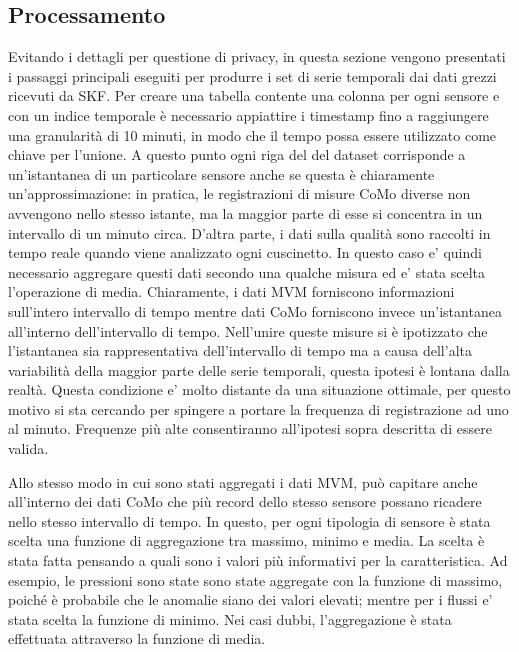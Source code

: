 \subsection{Processamento}
Evitando i dettagli per questione di privacy, in questa sezione vengono presentati i passaggi principali eseguiti per produrre i set di serie temporali dai dati grezzi ricevuti da SKF. 
Per creare una tabella contente una colonna per ogni sensore e con un indice temporale è necessario appiattire i timestamp fino a raggiungere una granularità di 10 minuti, in modo che il tempo possa essere utilizzato come chiave per l'unione. A questo punto ogni riga del del dataset corrisponde a un'istantanea di un particolare sensore anche se questa è chiaramente un'approssimazione: in pratica, le registrazioni di misure CoMo diverse non avvengono nello stesso istante, ma la maggior parte di esse si concentra in un intervallo di un minuto circa. 
D'altra parte, i dati sulla qualità sono raccolti in tempo reale quando viene analizzato ogni cuscinetto. In questo caso e' quindi necessario aggregare questi dati secondo una qualche misura ed e' stata scelta l'operazione di media.
Chiaramente, i dati MVM forniscono informazioni sull'intero intervallo di tempo mentre dati CoMo forniscono invece un'istantanea all'interno dell'intervallo di tempo.
Nell'unire queste misure si è ipotizzato che l'istantanea sia rappresentativa dell'intervallo di tempo ma a causa dell'alta variabilità della maggior parte delle serie temporali, questa ipotesi è lontana dalla realtà.
Questa condizione e' molto distante da una situazione ottimale, per questo motivo si sta cercando per spingere a portare la frequenza di registrazione ad uno al minuto. Frequenze più alte consentiranno all'ipotesi sopra descritta di essere valida.

Allo stesso modo in cui sono stati aggregati i dati MVM, può capitare anche all'interno dei dati CoMo che più record dello stesso sensore possano ricadere nello stesso intervallo di tempo. In questo, per ogni tipologia di sensore è stata scelta una funzione di aggregazione tra massimo, minimo e media. La scelta è stata fatta pensando a quali sono i valori più informativi per la caratteristica. Ad esempio, le pressioni sono state sono state aggregate con la funzione di massimo, poiché è probabile che le anomalie siano dei valori elevati; mentre per i flussi e' stata scelta la funzione di minimo. Nei casi dubbi, l'aggregazione è stata effettuata attraverso la funzione di media.

